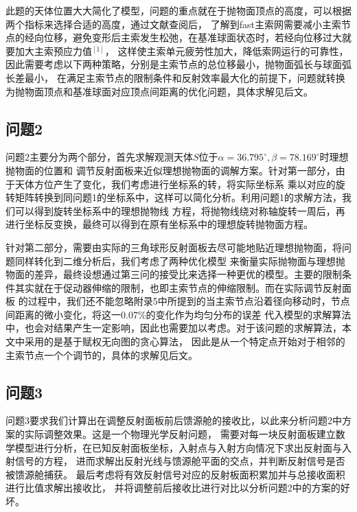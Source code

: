 \documentclass[withoutpreface,bwprint]{cumcmthesis} %
\begin{document}
        此题的天体位置大大简化了模型，问题的重点就在于抛物面顶点的高度，可以根据两个指标来选择合适的高度，通过文献查阅后，
	    了解到fast主索网需要减小主索节点的经向位移，避免变形后主索发生松弛，在基准球面状态时，若经向位移过大就要加大主索预应力值$^[1]$，
	    这样使主索单元疲劳性加大，降低索网运行的可靠性，因此需要考虑以下两种策略，分别是主索节点的总位移最小，抛物面弧长与球面弧长差最小，
	    在满足主索节点的限制条件和反射效率最大化的前提下，问题就转换为抛物面顶点和基准球面对应顶点间距离的优化问题，具体求解见后文。
        
        
        
        \subsection{问题2}

        问题2主要分为两个部分，首先求解观测天体$S$位于$\alpha = 36.795^\circ, \beta = 78.169^\circ$时理想抛物面的位置和
        调节反射面板来近似理想抛物面的调解方案。针对第一部分，由于天体方位产生了变化，我们考虑进行坐标系的转，将实际坐标系
        乘以对应的旋转矩阵转换到同问题1的坐标系中，这样可以简化分析。利用问题1的求解方法，我们可以得到旋转坐标系中的理想抛物线
        方程，将抛物线绕对称轴旋转一周后，再进行坐标反变换，最终可以得到在原有坐标系中的理想旋转抛物面方程。

        针对第二部分，需要由实际的三角球形反射面板去尽可能地贴近理想抛物面，将问题同样转化到二维分析后，我们考虑了两种优化模型
        来衡量实际抛物面与理想抛物面的差异，最终设想通过第三问的接受比来选择一种更优的模型。主要的限制条件其实就在于促动器伸缩的限制，也即主索节点的伸缩限制。而在实际调节反射面板
        的过程中，我们还不能忽略附录5中所提到的当主索节点沿着径向移动时，节点间距离的微小变化，将这一0.07\%的变化作为均匀分布的误差
        代入模型的求解算法中，也会对结果产生一定影响，因此也需要加以考虑。对于该问题的求解算法，本文中采用的是基于赋权无向图的贪心算法，
        因此是从一个特定点开始对于相邻的主索节点一个个调节的，具体的求解见后文。
        
        
        \subsection{问题3} 
        问题3要求我们计算出在调整反射面板前后馈源舱的接收比，以此来分析问题2中方案的实际调整效果。这是一个物理光学反射问题，
        需要对每一块反射面板建立数学模型进行分析，在已知反射面板坐标，入射点与入射方向情况下求出反射面与入射信号的方程，
        进而求解出反射光线与馈源舱平面的交点，并判断反射信号是否被馈源舱捕获。
        最后考虑将有效反射信号对应的反射板面积累加并与总接收面积进行比值求解出接收比，
        并将调整前后接收比进行对比以分析问题2中的方案的好坏。
\end{document}
